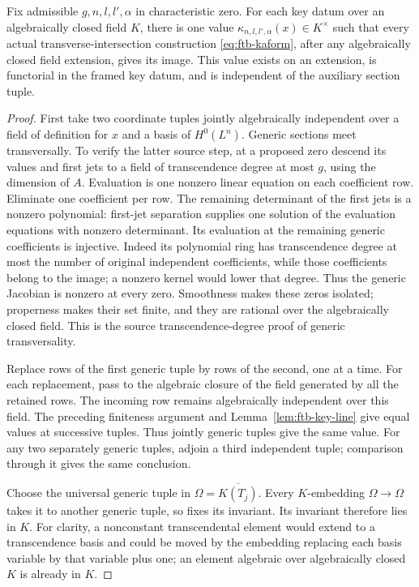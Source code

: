 \begin{srproposition}
\label{prop:ftb-key-tuple-independent}
Fix admissible \(g,n,l,l',\alpha\) in characteristic zero.
For each key datum over an algebraically closed field \(K\), there is
one value \(\kappa_{n,l,l',\alpha}(x)\in K^\times\) such that
every actual transverse-intersection construction
\eqref{eq:ftb-kaform}, after any algebraically closed field
extension, gives its image.  This value exists on an extension,
is functorial in the framed key datum, and is independent of the
auxiliary section tuple.
\end{srproposition}
\begin{proof}
First take two coordinate tuples jointly algebraically independent
over a field of definition for \(x\) and a basis of \(H^0(L^n)\).
Generic sections meet transversally.  To verify the latter source
step, at a proposed zero descend its values and first jets to a field
of transcendence degree at most \(g\), using the dimension of \(A\).
Evaluation is one nonzero linear equation on each coefficient row.
Eliminate one coefficient per row.  The remaining determinant of
the first jets is a nonzero polynomial: first-jet separation supplies
one solution of the evaluation equations with nonzero determinant.
Its evaluation at the remaining generic coefficients is injective.
Indeed its polynomial ring has transcendence degree at most the
number of original independent coefficients, while those
coefficients belong to the image; a nonzero kernel would lower
that degree.  Thus the generic Jacobian is nonzero at every zero.
Smoothness makes these zeros isolated; properness makes their set
finite, and they are rational over the algebraically closed field.
This is the source transcendence-degree proof of generic
transversality.

Replace rows of the first generic tuple by rows of the second, one
at a time.  For each replacement, pass to the algebraic closure of
the field generated by all the retained rows.
The incoming row remains algebraically independent over this field.
The preceding finiteness argument and
Lemma~\ref{lem:ftb-key-line} give equal values at successive tuples.
Thus jointly generic tuples give the same value.
For any two separately generic tuples, adjoin a third independent
tuple; comparison through it gives the same conclusion.

Choose the universal generic tuple in
\(\Omega=\overline{K(T_j)}\).
Every \(K\)-embedding \(\Omega\to\Omega\) takes it to another
generic tuple, so fixes its invariant.
Its invariant therefore lies in \(K\).
For clarity, a nonconstant transcendental element would extend to a
transcendence basis and could be moved by the embedding replacing
each basis variable by that variable plus one; an element algebraic
over algebraically closed \(K\) is already in \(K\).


\end{proof}
